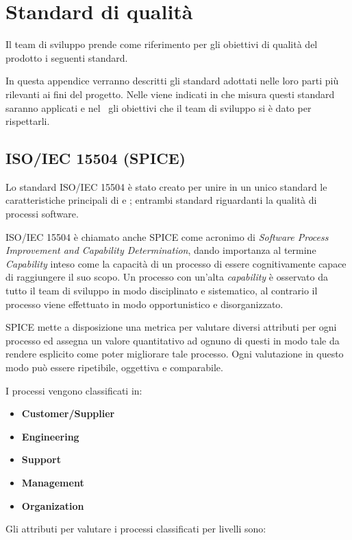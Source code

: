 \newpage
\section{Standard di qualità}
Il team di sviluppo prende come riferimento per gli obiettivi di qualità del prodotto i seguenti standard.

In questa appendice verranno descritti gli standard adottati nelle loro parti più rilevanti ai fini del progetto. Nelle \NdP\D viene indicati in che misura questi standard saranno applicati e nel \PdQ~gli obiettivi che il team di sviluppo si è dato per rispettarli.

	\subsection{ISO/IEC 15504 (SPICE)}
	Lo standard ISO/IEC 15504 è stato creato per unire in un unico standard le caratteristiche principali di  e ; entrambi standard riguardanti la qualità di processi software.
	
	ISO/IEC 15504 è chiamato anche SPICE come acronimo di \textit{Software Process Improvement and Capability Determination}, dando importanza al termine \textit{Capability} inteso come la capacità di un processo di essere cognitivamente capace di raggiungere il suo scopo. Un processo con un'alta \textit{capability} è osservato da tutto il team di sviluppo in modo disciplinato e sistematico, al contrario il processo viene effettuato in modo opportunistico e disorganizzato.
	
	SPICE mette a disposizione una metrica per valutare diversi attributi per ogni processo ed assegna un valore quantitativo ad ognuno di questi in modo tale da rendere esplicito come poter migliorare tale processo. Ogni valutazione in questo modo può essere ripetibile, oggettiva e comparabile.
	
	I processi vengono classificati in:
	
	\begin{itemize}
		\item \textbf{Customer/Supplier}
		\item \textbf{Engineering}
		\item \textbf{Support}
		\item \textbf{Management}
		\item \textbf{Organization}
	\end{itemize}
	
	Gli attributi per valutare i processi classificati per livelli sono:
	
